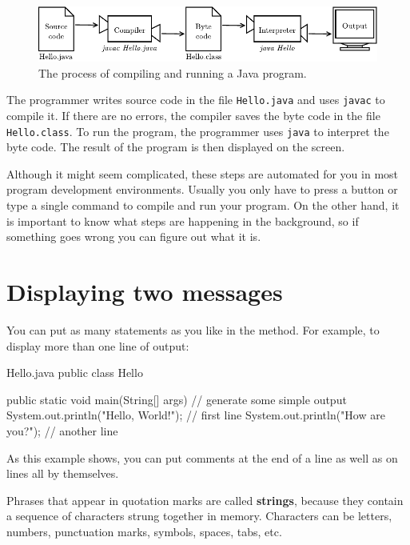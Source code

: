 \begin{figure}[!ht]
\begin{center}
\includegraphics{figs/compiler.pdf}
\caption{The process of compiling and running a Java program.}
\label{fig.compiler}
\end{center}
\end{figure}

The programmer writes source code in the file {\tt Hello.java} and uses {\tt javac} to compile it.
If there are no errors, the compiler saves the byte code in the file {\tt Hello.class}.
To run the program, the programmer uses {\tt java} to interpret the byte code.
The result of the program is then displayed on the screen.

Although it might seem complicated, these steps are automated for you in most program development environments.
Usually you only have to press a button or type a single command to compile and run your program.
On the other hand, it is important to know what steps are happening in the background, so if something goes wrong you can figure out what it is.


\section{Displaying two messages}

You can put as many statements as you like in the  method.
For example, to display more than one line of output:

\begin{trinket}[250]{Hello.java}
public class Hello {

    public static void main(String[] args) {
        // generate some simple output
        System.out.println("Hello, World!");  // first line
        System.out.println("How are you?");   // another line
    }
}
\end{trinket}

As this example shows, you can put comments at the end of a line as well as on lines all by themselves.


Phrases that appear in quotation marks are called {\bf strings}, because they contain a sequence of characters strung together in memory.
Characters can be letters, numbers, punctuation marks, symbols, spaces, tabs, etc.

